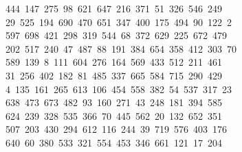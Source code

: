 \begin{tabbing}
\ 444\ 147\ 275\ 98\ 621\ 647\ 216\ 371\ 51\ 326\ 546\ 249\\[0pt]
\>\ 29\ 525\ 194\ 690\ 470\ 651\ 347\ 400\ 175\ 494\ 90\ 122\ 2\\[0pt]
\ 597\ 698\ 421\ 298\ 319\ 544\ 68\ 372\ 629\ 225\ 672\ 479\\[0pt]
\>\ 202\ 517\ 240\ 47\ 487\ 88\ 191\ 384\ 654\ 358\ 412\ 303\ 70\\[0pt]
\ 589\ 139\ 8\ 111\ 604\ 276\ 164\ 569\ 433\ 512\ 211\ 461\ \\[0pt]
\ 31\ 256\ 402\ 182\ 81\ 485\ 337\ 665\ 584\ 715\ 290\ 429\\[0pt]
\>\ 4\ 135\ 161\ 265\ 613\ 106\ 454\ 558\ 382\ 54\ 537\ 317\ 23\\[0pt]
\ 638\ 473\ 673\ 482\ 93\ 160\ 271\ 43\ 248\ 181\ 394\ 585\ \\[0pt]
\ 624\ 239\ 328\ 535\ 366\ 70\ 445\ 562\ 20\ 132\ 652\ 351\\[0pt]
\>\ 507\ 203\ 430\ 294\ 612\ 116\ 244\ 39\ 719\ 576\ 403\ 176\ \\[0pt]
\ 640\ 60\ 380\ 533\ 321\ 554\ 453\ 346\ 661\ 121\ 17\ 204\\[0pt]

\end{tabbing}
